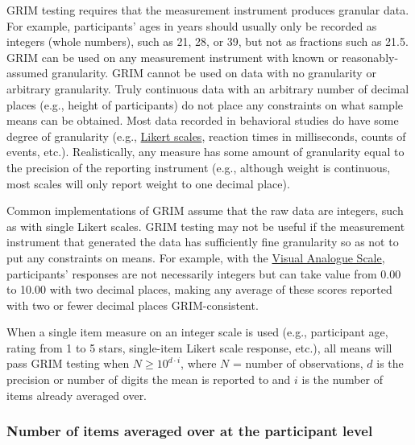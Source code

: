 \documentclass[letterpaper, 12pt]{article}
\begin{document}
GRIM testing requires that the measurement instrument produces granular data. For example, participants' ages in years should usually only be recorded as integers (whole numbers), such as 21, 28, or 39, but not as fractions such as 21.5. GRIM can be used on any measurement instrument with known or reasonably-assumed granularity. GRIM cannot be used on data with no granularity or arbitrary granularity. Truly continuous data with an arbitrary number of decimal places (e.g., height of participants) do not place any constraints on what sample means can be obtained. Most data recorded in behavioral studies do have some degree of granularity (e.g., \href{https://en.wikipedia.org/wiki/Likert_scale}{Likert scales}, reaction times in milliseconds, counts of events, etc.). Realistically, any measure has some amount of granularity equal to the precision of the reporting instrument (e.g., although weight is continuous, most scales will only report weight to one decimal place).

Common implementations of GRIM assume that the raw data are integers, such as with single Likert scales. GRIM testing may not be useful if the measurement instrument that generated the data has sufficiently fine granularity so as not to put any constraints on means. For example, with the \href{https://en.wikipedia.org/wiki/Visual_analogue_scale}{Visual Analogue Scale}, participants' responses are not necessarily integers but can take value from 0.00 to 10.00 with two decimal places, making any average of these scores reported with two or fewer decimal places GRIM-consistent.

When a single item measure on an integer scale is used (e.g., participant age, rating from 1 to 5 stars, single-item Likert scale response, etc.), all means will pass GRIM testing when $N \geq 10^{d \cdot i}$, where $N$ = number of observations, $d$ is the precision or number of digits the mean is reported to and $i$ is the number of items already averaged over. 

\subsubsection*{Number of items averaged over at the participant level}
\end{document}
